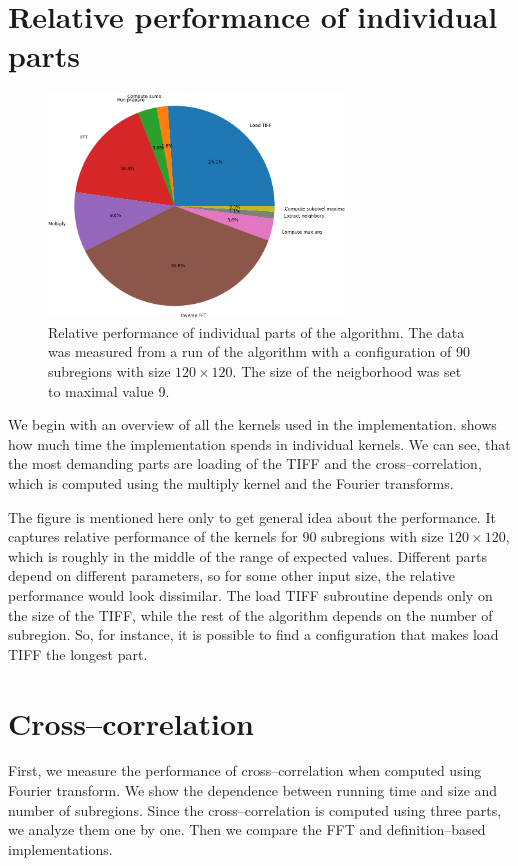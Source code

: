 \section{Relative performance of individual parts}

\begin{figure}
	\centering
	\includegraphics[width=0.7\textwidth]{img/eval/individual-parts}
	\caption{Relative performance of individual parts of the algorithm. The data was measured from a run of the algorithm with a configuration of 90 subregions with size $120 \times 120$. The size of the neigborhood was set to maximal value 9. }
	\label{individual-parts}
\end{figure}

We begin with an overview of all the kernels used in the implementation.  shows how much time the implementation spends in individual kernels. We can see, that the most demanding parts are loading of the TIFF and the cross--correlation, which is computed using the multiply kernel and the Fourier transforms.

The figure is mentioned here only to get general idea about the performance. It captures relative performance of the kernels for 90 subregions with size $120 \times 120$, which is roughly in the middle of the range of expected values. Different parts depend on different parameters, so for some other input size, the relative performance would look dissimilar. The load TIFF subroutine depends only on the size of the TIFF, while the rest of the algorithm depends on the number of subregion. So, for instance, it is possible to find a configuration that makes load TIFF the longest part. 

\section{Cross--correlation}
First, we measure the performance of cross--correlation when computed using Fourier transform. We show the dependence between running time and size and number of subregions. Since the cross--correlation is computed using three parts, we analyze them one by one. Then we compare the FFT and definition--based implementations.


